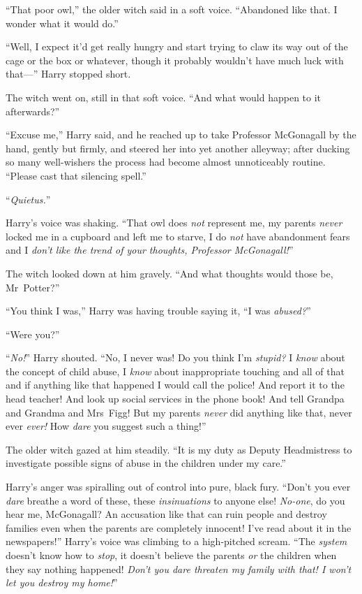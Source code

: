 “That poor owl,” the older witch said in a soft voice. “Abandoned like that. I wonder what it would do.”

“Well, I expect it’d get really hungry and start trying to claw its way out of the cage or the box or whatever, though it probably wouldn’t have much luck with that—” Harry stopped short.

The witch went on, still in that soft voice. “And what would happen to it afterwards?”

“Excuse me,” Harry said, and he reached up to take Professor McGonagall by the hand, gently but firmly, and steered her into yet another alleyway; after ducking so many well-wishers the process had become almost unnoticeably routine. “Please cast that silencing spell.”

“\emph{Quietus.}”

Harry’s voice was shaking. “That owl does \emph{not} represent me, my parents \emph{never} locked me in a cupboard and left me to starve, I do \emph{not} have abandonment fears and I \emph{don’t like the trend of your thoughts, Professor McGonagall!}”

The witch looked down at him gravely. “And what thoughts would those be, Mr~Potter?”

“You think I was,” Harry was having trouble saying it, “I was \emph{abused?}”

“Were you?”

“\emph{No!}” Harry shouted. “No, I never was! Do you think I’m \emph{stupid?} I \emph{know} about the concept of child abuse, I \emph{know} about inappropriate touching and all of that and if anything like that happened I would call the police! And report it to the head teacher! And look up social services in the phone book! And tell Grandpa and Grandma and Mrs~Figg! But my parents \emph{never} did anything like that, never ever \emph{ever!} How \emph{dare} you suggest such a thing!”

The older witch gazed at him steadily. “It is my duty as Deputy Headmistress to investigate possible signs of abuse in the children under my care.”

Harry’s anger was spiralling out of control into pure, black fury. “Don’t you ever \emph{dare} breathe a word of these, these \emph{insinuations} to anyone else! \emph{No-one}, do you hear me, McGonagall? An accusation like that can ruin people and destroy families even when the parents are completely innocent! I’ve read about it in the newspapers!” Harry’s voice was climbing to a high-pitched scream. “The \emph{system} doesn’t know how to \emph{stop}, it doesn’t believe the parents \emph{or} the children when they say nothing happened! \emph{Don’t you dare threaten my family with that! I won’t let you destroy my home!}”

